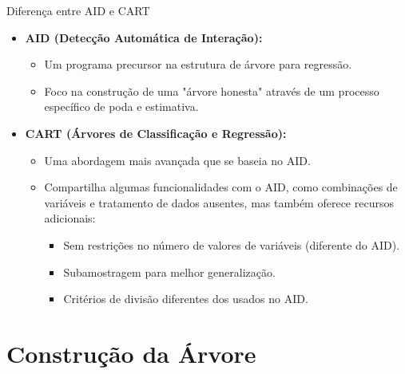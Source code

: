 \documentclass[handout,aspectratio = 169]{beamer}
\begin{document}
\begin{frame}{Diferença entre AID e CART}
\begin{itemize}
    \item \textbf{ AID (Detecção Automática de Interação):}
    \begin{itemize}
        \item Um programa precursor na estrutura de árvore para regressão.
        \item Foco na construção de uma "árvore honesta" através de um processo específico de poda e estimativa.
    \end{itemize}
     \vspace{1em} %
    \item  \textbf{CART (Árvores de Classificação e Regressão):}
    \begin{itemize}
        \item Uma abordagem mais avançada que se baseia no AID.
        \item Compartilha algumas funcionalidades com o AID, como combinações de variáveis e tratamento de dados ausentes, mas também oferece recursos adicionais:
        \begin{itemize}
            \item Sem restrições no número de valores de variáveis (diferente do AID).
            \item Subamostragem para melhor generalização.
            \item Critérios de divisão diferentes dos usados no AID.
        \end{itemize}
    \end{itemize}
\end{itemize}
\end{frame}


\section{Construção da Árvore}
\end{document}
